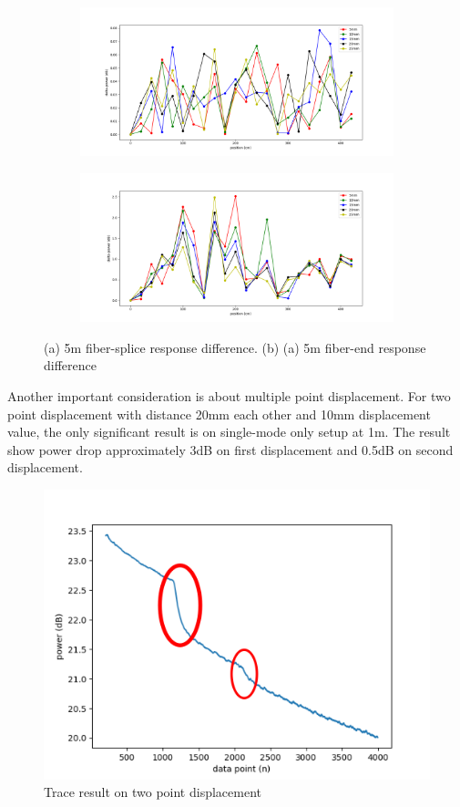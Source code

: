 \documentclass[a4paper,14pt]{article}
\begin{document}
\begin{figure}[h!]
	\centering
	\captionsetup{justification=centering}
	\begin{subfigure}[b]{0.4\textwidth}
		\includegraphics[width=\textwidth]{images/splice1_5}
		\caption{}
	\end{subfigure}
	\begin{subfigure}[b]{0.4\textwidth}
		\includegraphics[width=\textwidth]{images/end_5}
		\caption{}
	\end{subfigure}
	\caption[Setup Diagram]{\small{(a) 5m fiber-splice response difference. (b) (a) 5m fiber-end response difference}}
\end{figure}

Another important consideration is about multiple point displacement.
For two point displacement with distance 20mm each other and 10mm displacement value, the only significant result is on single-mode only setup at 1m.
The result show power drop approximately 3dB on first displacement and 0.5dB on second displacement. 

\begin{figure}[h!]
	\centering
	\captionsetup{justification=centering}
	\includegraphics[width=0.4\linewidth]{images/base_2}
	\caption[Setup Diagram]{\small{Trace result on two point displacement}}
\end{figure}
  
  


\end{document}
